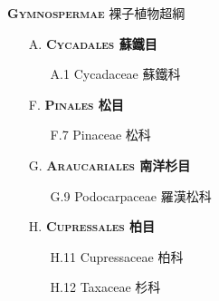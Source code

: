 \noindent \normalsize\textsc{\textbf{Gymnospermae} 裸子植物超綱}\selectfont \\
\footnotesize\selectfont
\begin{enumerate}
  \item[A. ] \textbf{\textsc{Cycadales} 蘇鐵目}   
    \begin{enumerate}
      \item[A.1] Cycadaceae 蘇鐵科      
        
\end{enumerate}
  \item[F. ] \textbf{\textsc{Pinales} 松目}   
    \begin{enumerate}
      \item[F.7] Pinaceae 松科      
        
\end{enumerate}
  \item[G. ] \textbf{\textsc{Araucariales} 南洋杉目}   
    \begin{enumerate}
      \item[G.9] Podocarpaceae 羅漢松科      
        
\end{enumerate}
  \item[H. ] \textbf{\textsc{Cupressales} 柏目}   
    \begin{enumerate}
      \item[H.11] Cupressaceae 柏科      
        
      \item[H.12] Taxaceae 杉科      
        
\end{enumerate}
\end{enumerate}
\vspace{2ex} 
